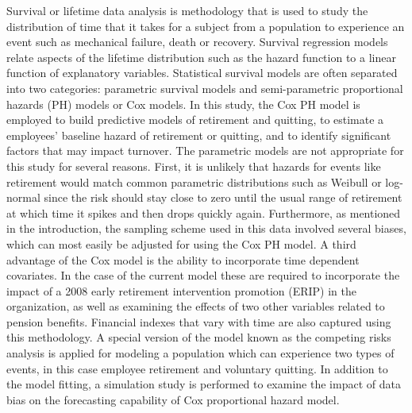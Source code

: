 \documentclass[12pt,letterpaper]{article}
\begin{document}
Survival or lifetime data analysis is methodology that is used to study the distribution of time that it takes for a subject from a population to experience an event such as mechanical failure, death or recovery. Survival regression models relate aspects of the lifetime distribution such as the hazard function to a linear function of explanatory variables.  Statistical survival models are often separated into two categories: parametric survival models and semi-parametric proportional hazards (PH) models or Cox models. In this study, the Cox PH model is employed to build predictive models of retirement and quitting, to estimate a employees' baseline hazard of retirement or quitting, and to identify significant factors that may impact turnover. The parametric models are not appropriate for this study for several reasons. First, it is unlikely that hazards for events like retirement would match common parametric distributions such as Weibull or log-normal since the risk should stay close to zero until the usual range of retirement at which time it spikes and then drops quickly again. Furthermore, as mentioned in the introduction, the sampling scheme used in this data involved several biases, which can most easily be adjusted for using the Cox PH model. A third advantage of the Cox model is the ability to incorporate time dependent covariates. In the case of the current model these are required to incorporate the impact of a 2008 early retirement intervention promotion (ERIP) in the organization, as well as examining the effects of two other variables related to pension benefits. Financial indexes that vary with time are also captured using this methodology. A special version of the model known as the competing risks analysis is applied for modeling a population which can experience two types of events, in this case employee retirement and voluntary quitting. In addition to the model fitting, a simulation study is performed to examine the impact of data bias on the forecasting capability of Cox proportional hazard model.
\end{document}
